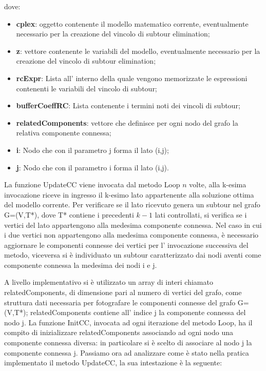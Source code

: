 \documentclass[11pt]{article}
\begin{document}
dove:

\begin{itemize}
    \item \textbf{cplex}: oggetto contenente il modello matematico corrente, eventualmente necessario per la creazione del vincolo di subtour elimination;
    \item \textbf{z}: vettore contenente le variabili del modello, eventualmente necessario per la creazione del vincolo di subtour elimination;
    \item \textbf{rcExpr}: Lista all' interno della quale vengono memorizzate le espressioni contenenti le variabili del vincolo di subtour;
    \item \textbf{bufferCoeffRC}: Lista contenente i termini noti dei vincoli di subtour;
    \item \textbf{relatedComponents}: vettore che definisce per ogni nodo del grafo la relativa componente connessa;
    \item \textbf{i}: Nodo che con il parametro j forma il lato (i,j);
    \item \textbf{j}: Nodo che con il parametro i forma il lato (i,j).
\end{itemize}

La funzione UpdateCC viene invocata dal metodo Loop $n$ volte, alla k-esima invocazione riceve in ingresso il k-esimo lato appartenente alla soluzione ottima del modello corrente. Per verificare se il lato ricevuto genera un subtour nel grafo G=(V,T*), dove T* contiene i precedenti $k-1$ lati controllati, si verifica se i vertici del lato appartengono alla medesima componente connessa. Nel caso in cui i due vertici non appartengono alla medesima componente connessa, è necessario aggiornare le componenti connesse dei vertici per l' invocazione successiva del metodo, viceversa si è  individuato un subtour caratterizzato dai nodi aventi come componente connessa la medesima dei nodi i e j.

A livello implementativo si è utilizzato un array di interi chiamato relatedComponents, di dimensione pari al numero di vertici del grafo, come struttura dati necessaria per fotografare le componenti connesse del grafo G=(V,T*); relatedComponents contiene all' indice j la componente connessa del nodo j. La funzione InitCC, invocata ad ogni iterazione del metodo Loop, ha il compito di inizializzare relatedComponents associando ad ogni nodo una componente connessa diversa: in particolare si è  scelto di associare al nodo j la componente connessa j. Passiamo ora ad analizzare come è  stato nella pratica implementato il metodo UpdateCC, la sua intestazione è la seguente:
\end{document}
